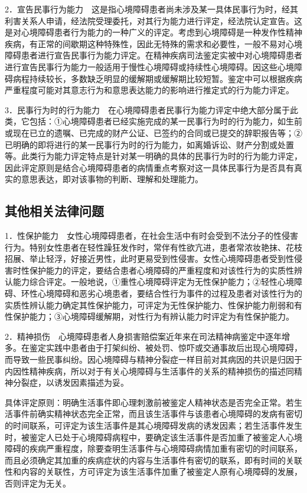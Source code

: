 2．宣告民事行为能力　这是指心境障碍患者尚未涉及某一具体民事行为时，经其利害关系人申请，经法院受理委托，对其行为能力进行评定，经法院认定宣告。这是对心境障碍患者行为能力的一种广义的评定。考虑到心境障碍是一种发作性精神疾病，有正常的间歇期这种特殊性，因此无特殊的需求和必要性，一般不易对心境障碍患者进行宣告民事行为能力评定。在精神疾病司法鉴定实被中对心境障碍患者进行宣告民事行为能力一般适用于慢性心境障碍或持续性心境障碍。因这些心境障碍病程持续较长，多数缺乏明显的缓解期或缓解期比较短暂。鉴定中可以根据疾病严重程度可能对其意志行为和意思表达能力的影响进行推定式的行为能力评定。

3．民事行为时的行为能力　在心境障碍患者民事行为能力评定中绝大部分属于此类，它包括：①心境障碍患者已经实施完成的某一民事行为时的行为能力，如生前或现在已立的遗嘱、已完成的财产公证、已签约的合同或已提交的辞职报告等；②已明确的即将进行的某一民事行为时的行为能力，如离婚诉讼、财产分割或处置等。此类行为能力评定特点是针对某一明确的具体的民事行为时的行为能力评定，因此评定原则是结合心境障碍患者的病情重点考察对这一具体民事行为是否具有真实的意思表达，即对该事物的判断、理解和处理能力。

\subsection{其他相关法律问题}

1．性保护能力　女性心境障碍患者，在社会生活中有时会受到不法分子的性侵害行为。特别女性患者在轻性躁狂发作时，常伴有性欲亢进，患者常浓妆艳抹、花枝招展、举止轻浮，好接近男性，此时更易受到性侵害。女性心境障碍患者受到性侵害时性保护能力的评定，要结合患者心境障碍的严重程度和对该性行为的实质性辨认能力综合评定。一般地说，①重性心境障碍评定为无性保护能力；②轻性心境障碍、环性心境障碍和恶劣心境患者，要结合性行为事件的过程及患者对该性行为的实质性辨认能力确定其性保护能力，可评定为无性保护能力、性保护能力削弱和有性保护能力；③心境障碍缓解期，对性行为有辨认能力时评定为有性保护能力。

2．精神损伤　心境障碍患者人身损害赔偿案近年来在司法精神病鉴定中逐年增多。在鉴定实践中患者由于打架纠纷、被处罚、惊吓或交通事故后出现心境障碍，而导致一些民事纠纷。因心境障碍与精神分裂症一样目前对其病因的共识是归因于内因性精神疾病，所以对于有关心境障碍与生活事件的关系的精神损伤的描述同精神分裂症，以诱发因素描述为妥。

具体评定原则：明确生活事件即心理刺激前被鉴定人精神状态是否完全正常。若生活事件前确实精神状态完全正常，而且该生活事件与该患者心境障碍的发病有密切的时间联系，可评定为该生活事件是其心境障碍发病的诱发因素；若生活事件发生时，被鉴定人已处于心境障碍病程中，要确定该生活事件是否加重了被鉴定人心境障碍的疾病严重程度，除要查明生活事件与心境障碍病情加重有密切的时间联系，而且必须确定其加重的疾病症状的内容与生活事件有密切的联系，即有时间的关联性和内容的关联性，方可评定为该生活事件加重了被鉴定人原有心境障碍的发展，否则评定为无关。


